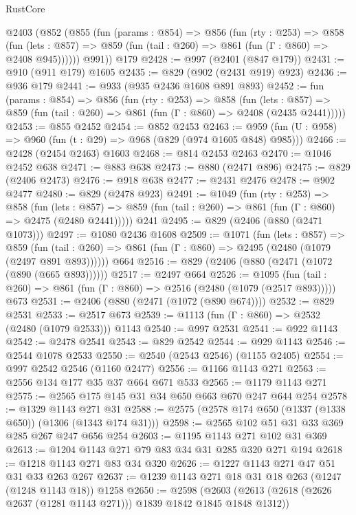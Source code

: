 \begin{lexlean}{RustCore}
\begin{coremodule}
    @2403
      (@852
        (@855
          (fun (params : @854) =>
          @856
            (fun (rty : @253) =>
            @858
              (fun (lets : @857) =>
              @859 (fun (tail : @260) => @861 (fun (Γ : @860) => @2408 @945))))))
        @991))
    @179
@2428 := @997 (@2401 (@847 @179))
@2431 := @910 (@911 @179) @1605
@2435 := @829 (@902 (@2431 @919) @923)
@2436 := @936 @179
@2441 := @933 (@935 @2436 @1608 @891 @893)
@2452 := fun (params : @854) =>
  @856
    (fun (rty : @253) =>
    @858
      (fun (lets : @857) =>
      @859 (fun (tail : @260) => @861 (fun (Γ : @860) => @2408 (@2435 @2441)))))
@2453 := @855 @2452
@2454 := @852 @2453
@2463 := @959 (fun (U : @958) => @960 (fun (t : @29) => @968 (@829 (@974 @1605 @848) @985)))
@2466 := @2428 (@2454 @2463) @1603
@2468 := @814 @2453 @2463
@2470 := @1046 @2452 @638
@2471 := @883 @638
@2473 := @880 (@2471 @896)
@2475 := @829 (@2406 @2473)
@2476 := @918 @638
@2477 := @2431 @2476
@2478 := @902 @2477
@2480 := @829 (@2478 @923)
@2491 := @1049
    (fun (rty : @253) =>
    @858
      (fun (lets : @857) =>
      @859 (fun (tail : @260) => @861 (fun (Γ : @860) => @2475 (@2480 @2441)))))
    @241
@2495 := @829 (@2406 (@880 (@2471 @1073)))
@2497 := @1080 @2436 @1608
@2509 := @1071
    (fun (lets : @857) =>
    @859 (fun (tail : @260) => @861 (fun (Γ : @860) => @2495 (@2480 (@1079 (@2497 @891 @893))))))
    @664
@2516 := @829 (@2406 (@880 (@2471 (@1072 (@890 (@665 @893))))))
@2517 := @2497 @664
@2526 := @1095
    (fun (tail : @260) => @861 (fun (Γ : @860) => @2516 (@2480 (@1079 (@2517 @893)))))
    @673
@2531 := @2406 (@880 (@2471 (@1072 (@890 @674))))
@2532 := @829 @2531
@2533 := @2517 @673
@2539 := @1113 (fun (Γ : @860) => @2532 (@2480 (@1079 @2533))) @1143
@2540 := @997 @2531
@2541 := @922 @1143
@2542 := @2478 @2541
@2543 := @829 @2542
@2544 := @929 @1143
@2546 := @2544 @1078 @2533
@2550 := @2540 (@2543 @2546) (@1155 @2405)
@2554 := @997 @2542 @2546 (@1160 @2477)
@2556 := @1166 @1143 @271
@2563 := @2556 @134 @177 @35 @37 @664 @671 @533
@2565 := @1179 @1143 @271
@2575 := @2565 @175 @145 @31 @34 @650 @663 @670 @247 @644 @254
@2578 := @1329 @1143 @271 @31
@2588 := @2575 (@2578 @174 @650 (@1337 (@1338 @650)) (@1306 (@1343 @174 @31)))
@2598 := @2565 @102 @51 @31 @33 @369 @285 @267 @247 @656 @254
@2603 := @1195 @1143 @271 @102 @31 @369
@2613 := @1204 @1143 @271 @79 @83 @34 @31 @285 @320 @271 @194
@2618 := @1218 @1143 @271 @83 @34 @320
@2626 := @1227 @1143 @271 @47 @51 @31 @33 @263 @267
@2637 := @1239 @1143 @271 @18 @31 @18 @263 (@1247 (@1248 @1143 @18)) @1258
@2650 := @2598
    (@2603 (@2613 (@2618 (@2626 @2637 (@1281 @1143 @271))) @1839 @1842 @1845 @1848 @1312))

\end{coremodule}
\end{lexlean}
